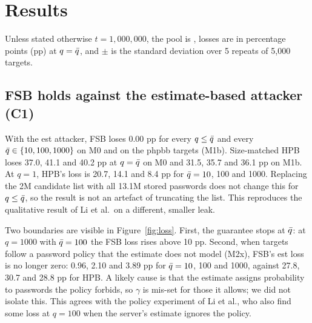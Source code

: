\begin{table}[t]
\centering
\caption{Implementation environment (versions pinned in \texttt{requirements.txt}).}
\label{tab:env}
\small

\end{table}

\section{Results}\label{sec:results}

Unless stated otherwise $t=1{,}000{,}000$, the pool is \Atest, losses are in percentage points (pp) at $q=\qbar$, and $\pm$ is the standard deviation over 5 repeats of 5,000 targets.

\subsection{FSB holds against the estimate-based attacker (C1)}\label{sec:c1}

\begin{table}[t]
\centering
\caption{Loss at $q=\qbar$ in pp (mean $\pm$ sd over 5 repeats). ``Removed'' is the share of the size-matched HPB loss that FSB removes (emp). ``Success ratio at $q=1$'' is the emp attacker's success at $q=1$ with the bucket divided by its success at $q=1$ without a bucket (mean $\pm$ sd over 5 repeats).}
\label{tab:headline}
\small
\setlength{\tabcolsep}{4.5pt}

\end{table}

With the est attacker, FSB loses 0.00 pp for every $q\le\bar q$ and every $\bar q\in\{10,100,1000\}$ on M0 and on the phpbb targets (M1b). Size-matched HPB loses 37.0, 41.1 and 40.2 pp at $q=\qbar$ on M0 and 31.5, 35.7 and 36.1 pp on M1b. At $q=1$, HPB's loss is 20.7, 14.1 and 8.4 pp for $\bar q=10$, 100 and 1000. Replacing the 2M candidate list with all 13.1M stored passwords does not change this for $q\le\bar q$, so the result is not an artefact of truncating the list. This reproduces the qualitative result of Li et al.\ on a different, smaller leak.

Two boundaries are visible in Figure~\ref{fig:loss}. First, the guarantee stops at $\bar q$: at $q=1000$ with $\bar q=100$ the FSB loss rises above 10 pp. Second, when targets follow a password policy that the estimate does not model (M2x), FSB's est loss is no longer zero: 0.96, 2.10 and 3.89 pp for $\bar q=10$, 100 and 1000, against 27.8, 30.7 and 28.8 pp for HPB. A likely cause is that the estimate assigns probability to passwords the policy forbids, so $\gamma$ is mis-set for those it allows; we did not isolate this. This agrees with the policy experiment of Li et al., who also find some loss at $q=100$ when the server's estimate ignores the policy.

